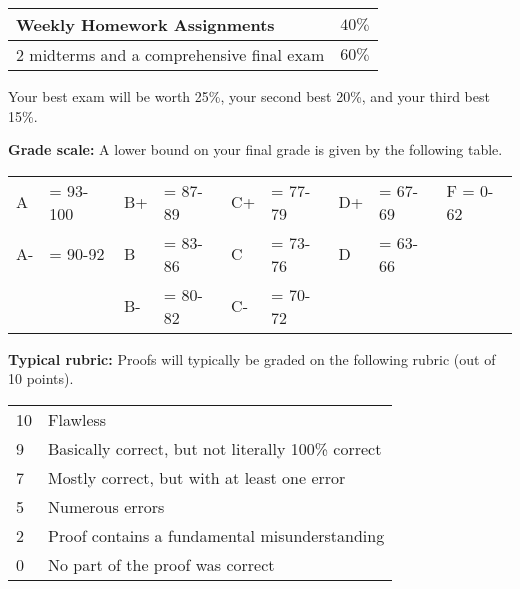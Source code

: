 \documentclass[12pt]{article}
\begin{document}
\begin{center}
  \begin{tabular}{|l|l|}
    \hline
    Weekly Homework Assignments & $40\%$ \\
    \hline    
    2 midterms and a comprehensive final exam  & $60\%$ 	 \\
    \hline
  \end{tabular}
\end{center}
Your best exam will be worth 25\%, your second best 20\%, and your third best 15\%.

\vspace*{.15in}
\noindent\textbf{Grade scale:} 
A lower bound on your final grade is given by the following table. 

\begin{center}
  \begin{tabular}{|ll|ll|ll|ll|l|}
\hline
A  &\hspace{-3 pt}\hspace{-7 pt}= 93-100   &B+ &\hspace{-7 pt}= 87-89  &C+ &\hspace{-7 pt}= 77-79 & D+ &\hspace{-7 pt}= 67-69  & F = 0-62\\
A- &\hspace{-3 pt}\hspace{-7 pt}= 90-92    &B  &\hspace{-7 pt}= 83-86  & C &\hspace{-7 pt}= 73-76  & D  &\hspace{-7 pt}= 63-66 &\\
   &                         &B- &\hspace{-7 pt}= 80-82  &C- &\hspace{-7 pt}= 70-72 &    &        &\\
    \hline
  \end{tabular}
\end{center}


\vspace*{.15in}
\noindent\textbf{Typical rubric:} 
Proofs will typically be graded on the following rubric (out of 10 points).

\begin{center}
  \begin{tabular}{|l|l|}
    \hline
    10& Flawless\\
    9& Basically correct, but not literally 100\% correct\\
    7& Mostly correct, but with at least one error\\    
    5& Numerous errors\\
    2& Proof contains a fundamental misunderstanding\\
    0& No part of the proof was correct\\
    \hline
  \end{tabular}
\end{center}
\end{document}
